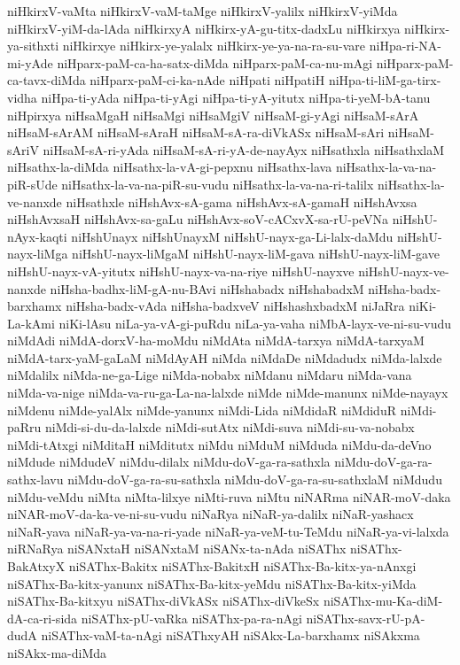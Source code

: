 {niHkirxV-vaMta
niHkirxV-vaM-taMge
niHkirxV-yalilx
niHkirxV-yiMda
niHkirxV-yiM-da-lAda
niHkirxyA
niHkirx-yA-gu-titx-dadxLu
niHkirxya
niHkirx-ya-sithxti
niHkirxye
niHkirx-ye-yalalx
niHkirx-ye-ya-na-ra-su-vare
niHpa-ri-NA-mi-yAde
niHparx-paM-ca-ha-satx-diMda
niHparx-paM-ca-nu-mAgi
niHparx-paM-ca-tavx-diMda
niHparx-paM-ci-ka-nAde
niHpati
niHpatiH
niHpa-ti-liM-ga-tirx-vidha
niHpa-ti-yAda
niHpa-ti-yAgi
niHpa-ti-yA-yitutx
niHpa-ti-yeM-bA-tanu
niHpirxya
niHsaMgaH
niHsaMgi
niHsaMgiV
niHsaM-gi-yAgi
niHsaM-sArA
niHsaM-sArAM
niHsaM-sAraH
niHsaM-sA-ra-diVkASx
niHsaM-sAri
niHsaM-sAriV
niHsaM-sA-ri-yAda
niHsaM-sA-ri-yA-de-nayAyx
niHsathxla
niHsathxlaM
niHsathx-la-diMda
niHsathx-la-vA-gi-pepxnu
niHsathx-lava
niHsathx-la-va-na-piR-sUde
niHsathx-la-va-na-piR-su-vudu
niHsathx-la-va-na-ri-talilx
niHsathx-la-ve-nanxde
niHsathxle
niHshAvx-sA-gama
niHshAvx-sA-gamaH
niHshAvxsa
niHshAvxsaH
niHshAvx-sa-gaLu
niHshAvx-soV-cACxvX-sa-rU-peVNa
niHshU-nAyx-kaqti
niHshUnayx
niHshUnayxM
niHshU-nayx-ga-Li-lalx-daMdu
niHshU-nayx-liMga
niHshU-nayx-liMgaM
niHshU-nayx-liM-gava
niHshU-nayx-liM-gave
niHshU-nayx-vA-yitutx
niHshU-nayx-va-na-riye
niHshU-nayxve
niHshU-nayx-ve-nanxde
niHsha-badhx-liM-gA-nu-BAvi
niHshabadx
niHshabadxM
niHsha-badx-barxhamx
niHsha-badx-vAda
niHsha-badxveV
niHshashxbadxM
niJaRra
niKi-La-kAmi
niKi-lAsu
niLa-ya-vA-gi-puRdu
niLa-ya-vaha
niMbA-layx-ve-ni-su-vudu
niMdAdi
niMdA-dorxV-ha-moMdu
niMdAta
niMdA-tarxya
niMdA-tarxyaM
niMdA-tarx-yaM-gaLaM
niMdAyAH
niMda
niMdaDe
niMdadudx
niMda-lalxde
niMdalilx
niMda-ne-ga-Lige
niMda-nobabx
niMdanu
niMdaru
niMda-vana
niMda-va-nige
niMda-va-ru-ga-La-na-lalxde
niMde
niMde-manunx
niMde-nayayx
niMdenu
niMde-yalAlx
niMde-yanunx
niMdi-Lida
niMdidaR
niMdiduR
niMdi-paRru
niMdi-si-du-da-lalxde
niMdi-sutAtx
niMdi-suva
niMdi-su-va-nobabx
niMdi-tAtxgi
niMditaH
niMditutx
niMdu
niMduM
niMduda
niMdu-da-deVno
niMdude
niMdudeV
niMdu-dilalx
niMdu-doV-ga-ra-sathxla
niMdu-doV-ga-ra-sathx-lavu
niMdu-doV-ga-ra-su-sathxla
niMdu-doV-ga-ra-su-sathxlaM
niMdudu
niMdu-veMdu
niMta
niMta-lilxye
niMti-ruva
niMtu
niNARma
niNAR-moV-daka
niNAR-moV-da-ka-ve-ni-su-vudu
niNaRya
niNaR-ya-dalilx
niNaR-yashacx
niNaR-yava
niNaR-ya-va-na-ri-yade
niNaR-ya-veM-tu-TeMdu
niNaR-ya-vi-lalxda
niRNaRya
niSANxtaH
niSANxtaM
niSANx-ta-nAda
niSAThx
niSAThx-BakAtxyX
niSAThx-Bakitx
niSAThx-BakitxH
niSAThx-Ba-kitx-ya-nAnxgi
niSAThx-Ba-kitx-yanunx
niSAThx-Ba-kitx-yeMdu
niSAThx-Ba-kitx-yiMda
niSAThx-Ba-kitxyu
niSAThx-diVkASx
niSAThx-diVkeSx
niSAThx-mu-Ka-diM-dA-ca-ri-sida
niSAThx-pU-vaRka
niSAThx-pa-ra-nAgi
niSAThx-savx-rU-pA-dudA
niSAThx-vaM-ta-nAgi
niSAThxyAH
niSAkx-La-barxhamx
niSAkxma
niSAkx-ma-diMda
}
